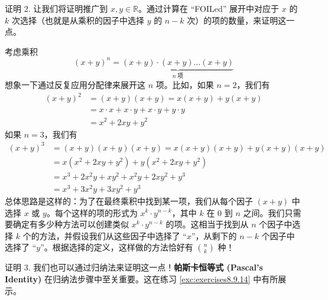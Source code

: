 \begin{proofs}{证明 2.}
    让我们将证明推广到 $x, y \in \mathbb{R}$。通过计算在 ``FOILed'' 展开中对应于 $x$ 的 $k$ 次选择（也就是从乘积的因子中选择 $y$ 的 $n - k$ 次）的项的数量，来证明这一点。

    考虑乘积
    \[(x+y)^n = \underbrace{(x+y) \cdot (x+y) \dots (x+y)}_{n \;\text{项}}\]
    想象一下通过反复应用分配律来展开这 $n$ 项。比如，如果 $n=2$，我们有
    \begin{align*}
        (x+y)^2 & = (x+y)(x+y) = x(x+y)+y(x+y)                    \\
                & = x \cdot x + x \cdot y + x \cdot y + y \cdot y \\
                & = x^2+2xy+y^2
    \end{align*}
    如果 $n=3$，我们有
    \begin{align*}
        (x+y)^3 & = (x+y)(x+y)(x+y) = x(x+y)(x+y) + y(x+y)(x+y) \\
                & = x(x^2+2xy+y^2) + y(x^2+2xy+y^2)             \\
                & = x^3 + 2x^2y + xy^2 + x^2y + 2xy^2 + y^3     \\
                & = x^3 + 3x^2y + 3xy^2 +y^3
    \end{align*}
    总体思路是这样的：为了在最终乘积中找到某一项，我们从每个因子 $(x + y)$ 中选择 $x$ 或 $y$。每个这样的项的形式为 $x^k \cdot y^{n-k}$，其中 $k$ 在 $0$ 到 $n$ 之间。我们只需要确定有多少种方法可以创建类似 $x^k \cdot y^{n-k}$ 的项。这相当于找到从 $n$ 个因子中选择 $k$ 个的方法，并假设我们从这些因子中选择了 ``$x$''，从剩下的 $n - k$ 个因子中选择了 ``$y$''。根据选择的定义，这样做的方法恰好有 ${n \choose k}$ 种！
\end{proofs}

\begin{proofs}{证明 3.}
    我们也可以通过归纳法来证明这一点！\textbf{帕斯卡恒等式 (Pascal's Identity)} 在归纳法步骤中至关重要。这在练习 \ref{exc:exercises8.9.14} 中有所展示。
\end{proofs}

